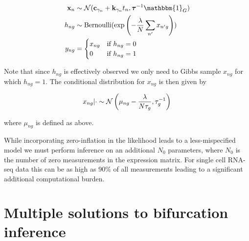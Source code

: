 \begin{equation}
\begin{aligned}
\bx_n & \sim \norm(\cgi + \kgi t_n, \btau^{-1} \mathbbm{1}_G) \\
h_{ng} & \sim \mathrm{Bernoulli}(\exp\left(-\frac{\lambda}{N} \sum_{n'} x_{n'g} \right)) \\
y_{ng} & = \begin{cases} x_{ng} &\mbox{if $h_{ng} = 0$}  \\
0 & \mbox{if $h_{ng} = 1$} \end{cases}
\end{aligned}
\end{equation}

Note that since $h_{ng}$ is effectively observed we only need to Gibbs sample $x_{ng}$ for which $h_{ng} = 1$. The conditional distribution for $x_{ng}$ is then given by

\begin{equation}
x_{ng} | \cdot \sim \mathcal{N}\left( \mu_{ng} - \frac{\lambda}{N \tau_g}, \tau_g^{-1} \right)
\end{equation}

where $\mu_{ng}$ is defined as above.




While incorporating zero-inflation in the likelihood leads to a less-mispecified model we must perform inference on an additional $N_0$ parameters, where $N_0$ is the number of zero measurements in the expression matrix. For single cell RNA-seq data this can be as high as 90\% of all measurements leading to a significant additional computational burden.



\section{Multiple solutions to bifurcation inference}

